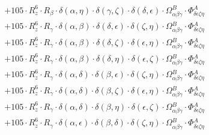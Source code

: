 \documentclass{article}
\begin{document}
\begin{equation}
\begin{array}{c}
 \\[0.2em] 		 + 105 \cdot R_{z}^{6} \cdot R_{\beta{}} \cdot \delta{}\left(\alpha{}, \eta{}\right) \cdot \delta{}\left(\gamma{}, \zeta{}\right) \cdot \delta{}\left(\delta{}, \epsilon{}\right) \cdot \Omega{}^{B}_{\alpha{}\beta{}\gamma{}} \cdot \Phi{}^{A}_{\delta{}\epsilon{}\zeta{}\eta{}} 
 \\[0.2em] 		 + 105 \cdot R_{z}^{6} \cdot R_{\gamma{}} \cdot \delta{}\left(\alpha{}, \beta{}\right) \cdot \delta{}\left(\delta{}, \epsilon{}\right) \cdot \delta{}\left(\zeta{}, \eta{}\right) \cdot \Omega{}^{B}_{\alpha{}\beta{}\gamma{}} \cdot \Phi{}^{A}_{\delta{}\epsilon{}\zeta{}\eta{}} 
 \\[0.2em] 		 + 105 \cdot R_{z}^{6} \cdot R_{\gamma{}} \cdot \delta{}\left(\alpha{}, \beta{}\right) \cdot \delta{}\left(\delta{}, \zeta{}\right) \cdot \delta{}\left(\epsilon{}, \eta{}\right) \cdot \Omega{}^{B}_{\alpha{}\beta{}\gamma{}} \cdot \Phi{}^{A}_{\delta{}\epsilon{}\zeta{}\eta{}} 
 \\[0.2em] 		 + 105 \cdot R_{z}^{6} \cdot R_{\gamma{}} \cdot \delta{}\left(\alpha{}, \beta{}\right) \cdot \delta{}\left(\delta{}, \eta{}\right) \cdot \delta{}\left(\epsilon{}, \zeta{}\right) \cdot \Omega{}^{B}_{\alpha{}\beta{}\gamma{}} \cdot \Phi{}^{A}_{\delta{}\epsilon{}\zeta{}\eta{}} 
 \\[0.2em] 		 + 105 \cdot R_{z}^{6} \cdot R_{\gamma{}} \cdot \delta{}\left(\alpha{}, \delta{}\right) \cdot \delta{}\left(\beta{}, \epsilon{}\right) \cdot \delta{}\left(\zeta{}, \eta{}\right) \cdot \Omega{}^{B}_{\alpha{}\beta{}\gamma{}} \cdot \Phi{}^{A}_{\delta{}\epsilon{}\zeta{}\eta{}} 
 \\[0.2em] 		 + 105 \cdot R_{z}^{6} \cdot R_{\gamma{}} \cdot \delta{}\left(\alpha{}, \delta{}\right) \cdot \delta{}\left(\beta{}, \zeta{}\right) \cdot \delta{}\left(\epsilon{}, \eta{}\right) \cdot \Omega{}^{B}_{\alpha{}\beta{}\gamma{}} \cdot \Phi{}^{A}_{\delta{}\epsilon{}\zeta{}\eta{}} 
 \\[0.2em] 		 + 105 \cdot R_{z}^{6} \cdot R_{\gamma{}} \cdot \delta{}\left(\alpha{}, \delta{}\right) \cdot \delta{}\left(\beta{}, \eta{}\right) \cdot \delta{}\left(\epsilon{}, \zeta{}\right) \cdot \Omega{}^{B}_{\alpha{}\beta{}\gamma{}} \cdot \Phi{}^{A}_{\delta{}\epsilon{}\zeta{}\eta{}} 
 \\[0.2em] 		 + 105 \cdot R_{z}^{6} \cdot R_{\gamma{}} \cdot \delta{}\left(\alpha{}, \epsilon{}\right) \cdot \delta{}\left(\beta{}, \delta{}\right) \cdot \delta{}\left(\zeta{}, \eta{}\right) \cdot \Omega{}^{B}_{\alpha{}\beta{}\gamma{}} \cdot \Phi{}^{A}_{\delta{}\epsilon{}\zeta{}\eta{}} 

\end{array}
\end{equation}
\end{document}

